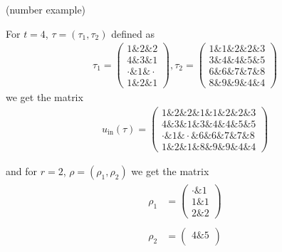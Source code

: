 \begin{example}{(number example)}
\noindent \begin{minipage}[t]{.5\textwidth}
For $t = 4$, $\tau = (\tau_{1}, \tau_{2})$ defined as
\begin{align*}
\tau_{1} = \begin{pmatrix}
1 \ampersand 2 \ampersand 2 \\
4 \ampersand 3 \ampersand 1 \\
\cdot \ampersand 1 \ampersand \cdot \\
1 \ampersand 2 \ampersand 1
\end{pmatrix},
\tau_{2} = \begin{pmatrix}
1 \ampersand 1 \ampersand 2 \ampersand 2 \ampersand 3 \\
3 \ampersand 4 \ampersand 4 \ampersand 5 \ampersand 5 \\
6 \ampersand 6 \ampersand 7 \ampersand 7 \ampersand 8 \\
8 \ampersand 9 \ampersand 9 \ampersand 4 \ampersand 4
\end{pmatrix}
\end{align*}
we get the matrix
\begin{align*}
u_{\text{in}}(\tau) = \begin{pmatrix}
1 \ampersand 2 \ampersand 2 \ampersand 1 \ampersand 1 \ampersand 2 \ampersand 2 \ampersand 3 \\
4 \ampersand 3 \ampersand 1 \ampersand 3 \ampersand 4 \ampersand 4 \ampersand 5 \ampersand 5 \\
\cdot \ampersand 1 \ampersand \cdot \ampersand 6 \ampersand 6 \ampersand 7 \ampersand 7 \ampersand 8 \\
1 \ampersand 2 \ampersand 1 \ampersand 8 \ampersand 9 \ampersand 9 \ampersand 4 \ampersand 4
\end{pmatrix}
\end{align*}
\end{minipage}
\begin{minipage}[t]{.5\textwidth}
and for $r = 2$, $\rho = (\rho_{1}, \rho_{2})$ we get the matrix
\begin{align*}
\begin{array}{rr}
\rho_{1} &= \begin{pmatrix}
\cdot \ampersand 1 \\
1 \ampersand 1 \\
2 \ampersand 2
\end{pmatrix} \\
\\
\rho_{2} &= \begin{pmatrix}
4 \ampersand 5 \\

\end{pmatrix}
\end{array}
\end{align*}
\end{minipage}
\end{example}
